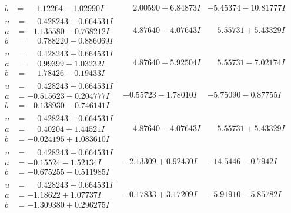 \documentclass[1p]{elsarticle_modified}
\theoremstyle{definition}
\begin{document}
$$\begin{array}{c|c|c}
\begin{aligned}
b &= \phantom{-}1.12264 - 1.02990 I\end{aligned}
 & \phantom{-}2.00590 + 6.84873 I & -5.45374 - 10.81777 I \\ \hline\begin{aligned}
u &= \phantom{-}0.428243 + 0.664531 I \\
a &= -1.135580 - 0.768212 I \\
b &= \phantom{-}0.788220 - 0.886069 I\end{aligned}
 & \phantom{-}4.87640 - 4.07643 I & \phantom{-}5.55731 + 5.43329 I \\ \hline\begin{aligned}
u &= \phantom{-}0.428243 + 0.664531 I \\
a &= \phantom{-}0.99399 - 1.03232 I \\
b &= \phantom{-}1.78426 - 0.19433 I\end{aligned}
 & \phantom{-}4.87640 + 5.92504 I & \phantom{-}5.55731 - 7.02174 I \\ \hline\begin{aligned}
u &= \phantom{-}0.428243 + 0.664531 I \\
a &= -0.515623 - 0.204777 I \\
b &= -0.138930 - 0.746141 I\end{aligned}
 & -0.55723 - 1.78010 I & -5.75090 - 0.87755 I \\ \hline\begin{aligned}
u &= \phantom{-}0.428243 + 0.664531 I \\
a &= \phantom{-}0.40204 + 1.44521 I \\
b &= -0.024195 + 1.083610 I\end{aligned}
 & \phantom{-}4.87640 - 4.07643 I & \phantom{-}5.55731 + 5.43329 I \\ \hline\begin{aligned}
u &= \phantom{-}0.428243 + 0.664531 I \\
a &= -0.15524 - 1.52134 I \\
b &= -0.675255 - 0.511985 I\end{aligned}
 & -2.13309 + 0.92430 I & -14.5446 - 0.7942 I \\ \hline\begin{aligned}
u &= \phantom{-}0.428243 + 0.664531 I \\
a &= -1.18622 + 1.07737 I \\
b &= -1.309380 + 0.296275 I\end{aligned}
 & -0.17833 + 3.17209 I & -5.91910 - 5.85782 I \\ \hline\begin{aligned}

\end{aligned}
\end{array}$$
\end{document}
